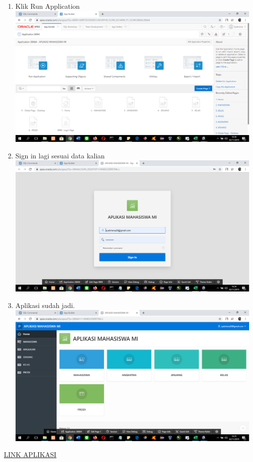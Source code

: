 \begin{enumerate}
\item Klik Run Application\\
\includegraphics[scale= 0.3]{gambar/gambar14.png}\\

\item Sign in lagi sesuai data kalian\\
\includegraphics[scale= 0.3]{gambar/gambar15.png}\\

\item Aplikasi sudah jadi.\\
\includegraphics[scale= 0.3]{gambar/gambar16.png}\\
\end{enumerate}

\href{https://apex.oracle.com/pls/apex/f?p=38664:1:114940233890784::NO:::}{LINK APLIKASI}